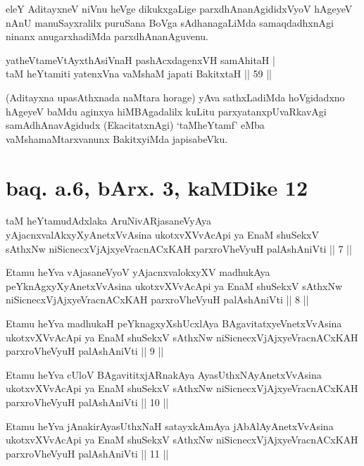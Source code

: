 \begin{artha}
eleY AditayxneV niVnu heVge dikukxgaLige parxdhAnanAgididxVyoV hAgeyeV 
nAnU manuSayxralilx puruSana BoVga sAdhanagaLiMda samaqdadhxnAgi 
ninanx anugarxhadiMda parxdhAnanAguvenu.
\end{artha}

\begin{shl}
yatheVtameVtAyxthA\s \s siVnaH pashAcxdagenxVH samAhitaH | \\
taM heYtamiti yatenxVna vaMshaM japati BakitxtaH \hfill|| 59 || 
\end{shl}

\begin{artha}
(Aditayxna upasAthxnada naMtara horage) yAva sathxLadiMda hoVgidadxno 
hAgeyeV baMdu aginxya hiMBAgadalilx kuLitu parxyatanxpUvaRkavAgi 
samAdhAnavAgidudx (EkacitatxnAgi) `taMheYtamf' eMba 
vaMshamaMtarxvanunx BakitxyiMda japisabeVku.
\end{artha}

\section*{baq. a.6, bArx. 3, kaMDike 12}

\begin{shl}
taM heYtamudAdxlaka AruNivARjasaneVyAya yAjacnxvalAkxyXyAnetxVvAsina ukotxvXVvAcApi ya EnaM shuSekxV sAthxNw niSicnecxVjAjxyeVracnACxKAH parxroVheVyuH palAshAniVti || 7 ||
\end{shl}

\begin{shl}
Etamu heYva vAjasaneVyoV yAjacnxvalokxyXV madhukAya peYknAgxyXyAnetxVvAsina ukotxvXVvAcApi ya EnaM shuSekxV sAthxNw niSicnecxVjAjxyeVracnACxKAH parxroVheVyuH palAshAniVti || 8 ||
\end{shl}

\begin{shl}
Etamu heYva madhukaH peYknagxyXshUcxlAya BAgavitatxyeV\s netxVvAsina ukotxvXVvAcApi ya EnaM shuSekxV sAthxNw niSicnecxVjAjxyeVracnACxKAH parxroVheVyuH palAshAniVti || 9 ||
\end{shl}

\begin{shl}
Etamu heYva cUloV BAgavititxjARnakAya AyasUthxNAyAnetxVvAsina ukotxvXVvAcApi ya EnaM shuSekxV sAthxNw niSicnecxVjAjxyeVracnACxKAH parxroVheVyuH palAshAniVti || 10 ||
\end{shl}

\begin{shl}
Etamu heYva jAnakirAyasUthxNaH satayxkAmAya jAbAlAyAnetxVvAsina ukotxvXVvAcApi ya EnaM shuSekxV sAthxNw niSicnecxVjAjxyeVracnACxKAH parxroVheVyuH palAshAniVti || 11 ||
\end{shl}

